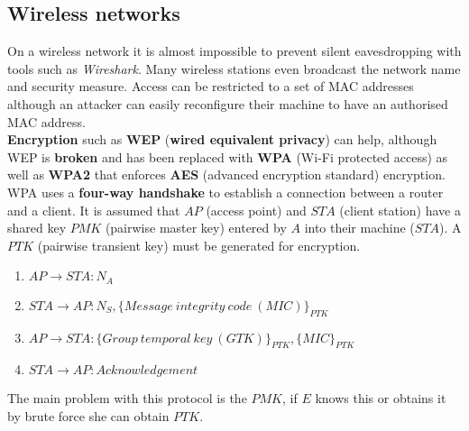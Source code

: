 \documentclass{article}
\newcommand{\np}{\vspace{8pt} \\}
\begin{document}
\subsection{Wireless networks}
On a wireless network it is almost impossible to prevent silent eavesdropping with tools such as \textit{Wireshark}. Many wireless stations even broadcast the network name and security measure. Access can be restricted to a set of MAC addresses although an attacker can easily reconfigure their machine to have an authorised MAC address. \np
\textbf{Encryption} such as \textbf{WEP} (\textbf{wired equivalent privacy}) can help, although WEP is \textbf{broken} and has been replaced with \textbf{WPA} (Wi-Fi protected access) as well as \textbf{WPA2} that enforces \textbf{AES} (advanced encryption standard) encryption. WPA uses a \textbf{four-way handshake} to establish a connection between a router and a client. It is assumed that $ AP $ (access point) and $ STA $ (client station) have a shared key $ PMK $ (pairwise master key) entered by $ A $ into their machine ($ STA $). A $ PTK $ (pairwise transient key) must be generated for encryption.
\begin{enumerate}
	\item $ AP \rightarrow STA : N_{A} $
	\item $ STA \rightarrow AP : N_{S}, \{ Message\ integrity\ code\ (MIC) \}_{PTK} $
	\item $ AP \rightarrow STA : \{ Group\ temporal\ key\ (GTK) \}_{PTK}, \{ MIC \}_{PTK} $
	\item $ STA \rightarrow AP : Acknowledgement $
\end{enumerate}
The main problem with this protocol is the $ PMK $, if $ E $ knows this or obtains it by brute force she can obtain $ PTK $.
\end{document}
